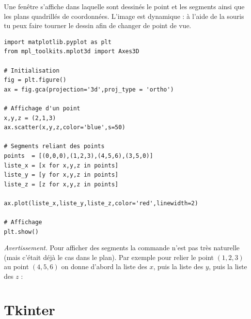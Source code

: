 \documentclass[11pt,class=report,crop=false]{standalone}
\begin{document}
Une fenêtre s'affiche dans laquelle sont dessinés le point et les segments ainsi que les plans quadrillés de coordonnées. L'image est dynamique : à l'aide de la souris tu peux faire tourner le dessin afin de changer de point de vue.

\begin{lstlisting}
import matplotlib.pyplot as plt
from mpl_toolkits.mplot3d import Axes3D

# Initialisation
fig = plt.figure()
ax = fig.gca(projection='3d',proj_type = 'ortho') 

# Affichage d'un point
x,y,z = (2,1,3)
ax.scatter(x,y,z,color='blue',s=50)

# Segments reliant des points
points  = [(0,0,0),(1,2,3),(4,5,6),(3,5,0)]
liste_x = [x for x,y,z in points]
liste_y = [y for x,y,z in points]
liste_z = [z for x,y,z in points]

ax.plot(liste_x,liste_y,liste_z,color='red',linewidth=2)

# Affichage
plt.show()
\end{lstlisting}


\emph{Avertissement.} Pour afficher des segments la commande  n'est pas très naturelle (mais c'était déjà le cas dans le plan). Par exemple pour relier le point $(1,2,3)$ au point $(4,5,6)$ on donne d'abord la liste des $x$, puis la liste des $y$, puis la liste des $z$ :

\section{Tkinter}
\end{document}
